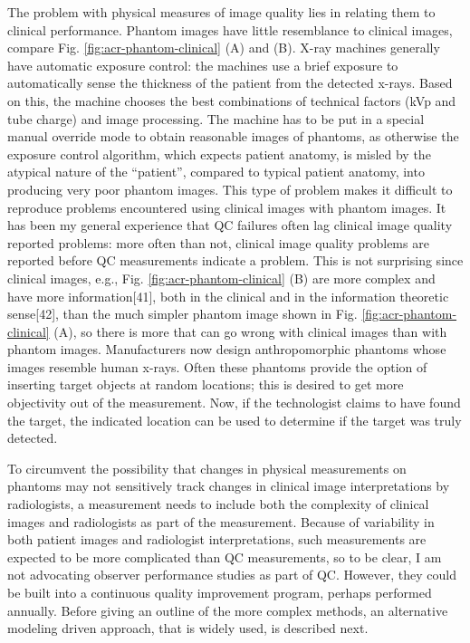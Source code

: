 \documentclass[
]{book}
\begin{document}
The problem with physical measures of image quality lies in relating them to clinical performance. Phantom images have little resemblance to clinical images, compare Fig. \ref{fig:acr-phantom-clinical} (A) and (B). X-ray machines generally have automatic exposure control: the machines use a brief exposure to automatically sense the thickness of the patient from the detected x-rays. Based on this, the machine chooses the best combinations of technical factors (kVp and tube charge) and image processing. The machine has to be put in a special manual override mode to obtain reasonable images of phantoms, as otherwise the exposure control algorithm, which expects patient anatomy, is misled by the atypical nature of the ``patient'', compared to typical patient anatomy, into producing very poor phantom images. This type of problem makes it difficult to reproduce problems encountered using clinical images with phantom images. It has been my general experience that QC failures often lag clinical image quality reported problems: more often than not, clinical image quality problems are reported before QC measurements indicate a problem. This is not surprising since clinical images, e.g., Fig. \ref{fig:acr-phantom-clinical} (B) are more complex and have more information{[}41{]}, both in the clinical and in the information theoretic sense{[}42{]}, than the much simpler phantom image shown in Fig. \ref{fig:acr-phantom-clinical} (A), so there is more that can go wrong with clinical images than with phantom images. Manufacturers now design anthropomorphic phantoms whose images resemble human x-rays. Often these phantoms provide the option of inserting target objects at random locations; this is desired to get more objectivity out of the measurement. Now, if the technologist claims to have found the target, the indicated location can be used to determine if the target was truly detected.

To circumvent the possibility that changes in physical measurements on phantoms may not sensitively track changes in clinical image interpretations by radiologists, a measurement needs to include both the complexity of clinical images and radiologists as part of the measurement. Because of variability in both patient images and radiologist interpretations, such measurements are expected to be more complicated than QC measurements, so to be clear, I am not advocating observer performance studies as part of QC. However, they could be built into a continuous quality improvement program, perhaps performed annually. Before giving an outline of the more complex methods, an alternative modeling driven approach, that is widely used, is described next.
\end{document}
